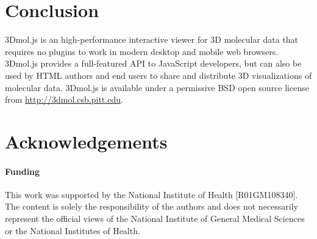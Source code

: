 \documentclass[]{bioinfo}
\begin{document}
\section{Conclusion}
3Dmol.js is an high-performance interactive viewer for 3D molecular data that requires no plugins to work in modern desktop and mobile web browsers.
3Dmol.js provides a full-featured API to JavaScript developers, but can also be used by HTML authors and end users to share and distribute
3D visualizations of molecular data. 3Dmol.js is available under a permissive BSD open source license from \url{http://3dmol.csb.pitt.edu}.
 
\section*{Acknowledgements}

\paragraph{Funding\textcolon} 
This work was supported by the National Institute of Health [R01GM108340].
The content is solely the responsibility of the authors and does not necessarily
represent the official views of the National Institute of General Medical Sciences
or the National Institutes of Health.



\end{document}
